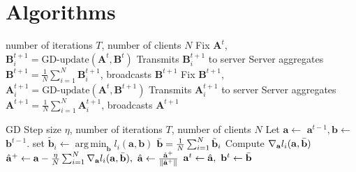 \documentclass{article}
\DeclareMathOperator*{\argmin}{arg\,min}
\theoremstyle{plain}
\theoremstyle{definition}
\theoremstyle{remark}
\begin{document}
\section{Algorithms}
\begin{algorithm}[H]
   \caption{RoLoRA iterations}
   \label{alg:rolora-llm}
\begin{algorithmic}[1]
    number of iterations $T$, number of clients $N$
   \STATE Fix $\mathbf{A}^{t}$, $\mathbf{B}_i^{t+1} = \text{GD-update}(\mathbf{A}^{t},\mathbf{B}^{t})$
   \STATE Transmits $\mathbf{B}_i^{t+1}$ to server
   \ENDFOR
   \STATE Server aggregates $\mathbf{B}^{t+1}=\frac{1}{N}\sum_{i=1}^{N}\mathbf{B}_i^{t+1}$, broadcasts $\mathbf{B}^{t+1}$
   \STATE Fix $\mathbf{B}^{t+1}$, $\mathbf{A}_i^{t+1} = \text{GD-update}(\mathbf{A}^{t},\mathbf{B}^{t+1})$
   \STATE Transmits $\mathbf{A}_i^{t+1}$ to server
   \ENDFOR
   \STATE Server aggregates $\mathbf{A}^{t+1}=\frac{1}{N}\sum_{i=1}^{N}\mathbf{A}_i^{t+1}$, broadcasts $\mathbf{A}^{t+1}$
   \ENDFOR
\end{algorithmic}
\end{algorithm}


\begin{algorithm}[H]
   \caption{RoLoRA for linear regressor, Alt-min-GD iterations}
   \label{alg:rolora-linear}
\begin{algorithmic}[1]
    GD Step size $\eta$, number of iterations $T$, number of clients $N$
   \STATE Let $\mathbf{a} \leftarrow$ $\mathbf{a}^{t-1}, \mathbf{b} \leftarrow$ $\mathbf{b}^{t-1}$.
   \STATE  set $\tilde{\mathbf{b}}_i \leftarrow \argmin_{\mathbf{b}} l_i(\mathbf{a},\mathbf{b})$
   \ENDFOR
   \STATE $\Bar{\mathbf{b}}=\frac{1}{N}\sum_{i=1}^{N}\tilde{\mathbf{b}}_i$
   \STATE Compute $\nabla_{\mathbf{a}} l_i(\mathbf{a},\Bar{\mathbf{b}})$
   \ENDFOR
   \STATE $\hat{\mathbf{a}}^{+} \leftarrow \mathbf{a}-\frac{\eta}{N}\sum_{i=1}^{N}\nabla_{\mathbf{a}} l_i(\mathbf{a},\Bar{\mathbf{b}}),~ \hat{\mathbf{a}} \leftarrow \frac{\hat{\mathbf{a}}^{+}}{\lVert \hat{\mathbf{a}}^{+}\rVert}$
   \STATE $\mathbf{a}^t \leftarrow \hat{\mathbf{a}},~ \mathbf{b}^t\leftarrow  \Bar{\mathbf{b}}$
   \ENDFOR
\end{algorithmic}
\end{algorithm}
\end{document}
